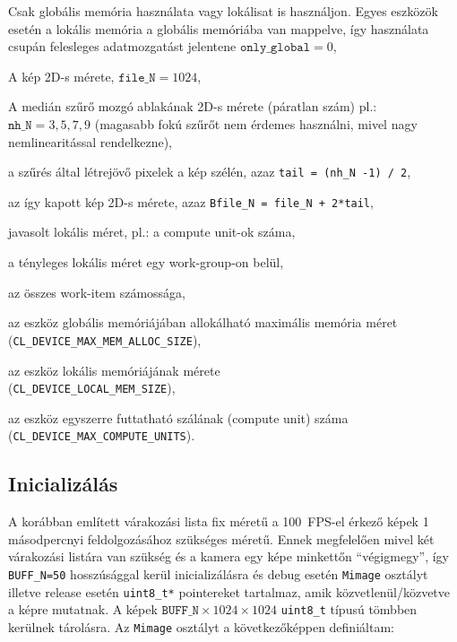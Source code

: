 	\begin{description}[noitemsep]
	\item[only\_global] Csak globális memória használata vagy lokálisat is használjon. Egyes eszközök esetén a lokális memória a
	globális memóriába van mappelve, így használata csupán felesleges adatmozgatást jelentene $\texttt{only\_global} = 0$,
	\item[file\_N] A kép 2D-s mérete, $\texttt{file\_N} = 1024$,
	\item[nh\_N] A medián szűrő mozgó ablakának 2D-s mérete (páratlan szám) pl.: $\texttt{nh\_N} = 3,5,7,9$ (magasabb fokú szűrőt
	nem érdemes használni, mivel nagy nemlinearitással rendelkezne),
	\item[tail] a szűrés által létrejövő pixelek a kép szélén, azaz \texttt{tail = (nh\_N -1) / 2},
	\item[Bfile\_N] az így kapott kép 2D-s mérete, azaz \texttt{Bfile\_N = file\_N + 2*tail},
	\item[pplN] javasolt lokális méret, pl.: a compute unit-ok száma,
	\item[localN] a tényleges lokális méret egy work-group-on belül,
	\item[globalN] az összes work-item számossága,
	\item[aSize] az eszköz globális memóriájában allokálható maximális memória méret\\
		(\texttt{CL\_DEVICE\_MAX\_MEM\_ALLOC\_SIZE}),
	\item[lSize] az eszköz lokális memóriájának mérete\\
		(\texttt{CL\_DEVICE\_LOCAL\_MEM\_SIZE}),
	\item[mCuint] az eszköz egyszerre futtatható szálának (compute unit) száma \\
		(\texttt{CL\_DEVICE\_MAX\_COMPUTE\_UNITS}).
	\end{description}
	

	\subsection*{Inicializálás}
	A korábban említett várakozási lista fix méretű a 100~FPS-el érkező képek 1 másodpercnyi feldolgozásához szükséges
	méretű. Ennek megfelelően mivel két várakozási listára van szükség és a kamera egy képe minkettőn ``végigmegy'', így
	\texttt{BUFF\_N=50} hosszúsággal kerül inicializálásra és debug esetén \texttt{Mimage} osztályt illetve release esetén
	\texttt{uint8\_t*} pointereket tartalmaz, amik közvetlenül/közvetve a képre mutatnak.
	A képek $\texttt{BUFF\_N} \times 1024 \times 1024$ \texttt{uint8\_t} típusú tömbben kerülnek tárolásra.
	Az \texttt{Mimage} osztályt a következőképpen definiáltam:
	
